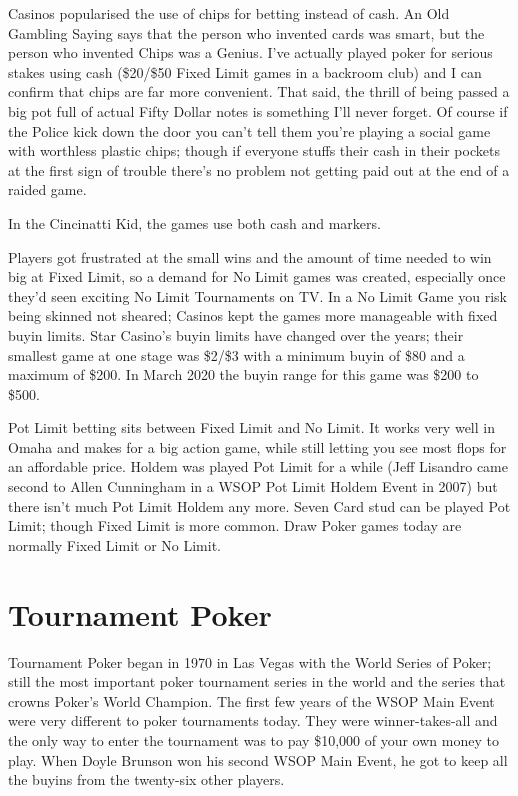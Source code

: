 Casinos popularised the use of chips for betting instead of cash.
An Old Gambling Saying says that the person who invented cards was
smart, but the person who invented Chips was a Genius. I've actually
played poker for serious stakes using cash (\$20/\$50 Fixed Limit
games in a backroom club) and I can confirm that chips are far more
convenient. That said, the thrill of being passed a big pot full of
actual Fifty Dollar notes is something I'll never forget. Of course if
the Police kick down the door you can't tell them you're playing
a social game with worthless plastic chips; though if everyone stuffs
their cash in their pockets at the first sign of trouble there's no
problem not getting paid out at the end of a raided game.

In the Cincinatti Kid, the games use both cash and markers.


Players got frustrated at the small wins and the amount of time needed
to win big at Fixed Limit, so a demand for No Limit games was created,
especially once they'd seen exciting No Limit Tournaments on TV.
In a No Limit Game you risk being skinned not sheared; Casinos kept
the games more manageable with fixed buyin limits. Star Casino's buyin limits
have changed over the years; their smallest game at one stage was
\$2/\$3 with a minimum buyin of \$80 and a maximum of \$200. In March 2020
the buyin range for this game was \$200 to \$500.

Pot Limit betting sits between Fixed Limit and No Limit. It works very
well in Omaha and makes for a big action game, while still letting you
see most flops for an affordable price. Holdem was played Pot Limit for
a while (Jeff Lisandro came second to Allen Cunningham in a WSOP Pot Limit
Holdem Event in 2007) but there isn't much Pot Limit Holdem any more.
Seven Card stud can be played Pot Limit; though Fixed Limit
is more common. Draw Poker games today are normally Fixed Limit or No Limit.

\section{Tournament Poker}

Tournament Poker began in 1970 in Las Vegas with the World Series of
Poker; still the most important poker tournament series in the world
and the series that crowns Poker's World Champion. The first few years
of the WSOP Main Event were very different to poker tournaments today.
They were winner-takes-all and the only way to enter the
tournament was to pay \$10,000 of your own money to play.
When Doyle Brunson won his second WSOP Main Event, he got to keep
all the buyins from the twenty-six other players.


